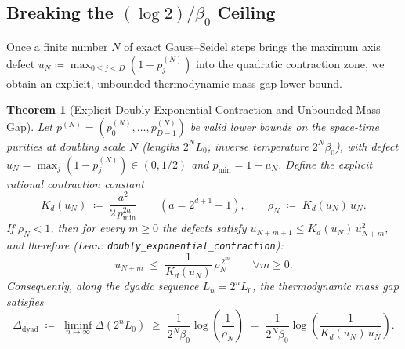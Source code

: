 \documentclass[11pt,a4paper]{article}
\newtheorem{theorem}{Theorem}[section]
\theoremstyle{definition}
\begin{document}
\subsection{Breaking the \texorpdfstring{$(\log 2)/\beta_0$}{(log 2)/beta0} Ceiling}

Once a finite number $N$ of exact Gauss--Seidel steps brings the maximum axis defect $u_N \coloneqq \max_{0 \le j < D}(1 - p_j^{(N)})$ into the quadratic contraction zone, we obtain an explicit, unbounded thermodynamic mass-gap lower bound.

\begin{theorem}[Explicit Doubly-Exponential Contraction and Unbounded Mass Gap]
\label{thm:doubly_exp}
Let $p^{(N)} = (p_0^{(N)},\dots,p_{D-1}^{(N)})$ be valid lower bounds on the space-time purities at doubling scale $N$ (lengths $2^N L_0$, inverse temperature $2^N \beta_0$), with defect $u_N = \max_j (1 - p_j^{(N)}) \in (0, 1/2)$ and $p_{\min} = 1 - u_N$. Define the explicit rational contraction constant
\begin{equation}
  K_d(u_N) \;\coloneqq\; \frac{a^2}{2\, p_{\min}^{2a}} \qquad (a = 2^{d+1} - 1),
  \qquad
  \rho_N \;\coloneqq\; K_d(u_N)\, u_N.
  \label{eq:Kd_rho}
\end{equation}
If $\rho_N < 1$, then for every $m \ge 0$ the defects satisfy $u_{N+m+1} \le K_d(u_N)\, u_{N+m}^2$, and therefore (Lean: \texttt{doubly\_exponential\_contraction}):
\begin{equation}
  u_{N+m} \;\le\; \frac{1}{K_d(u_N)}\, \rho_N^{\,2^m}
  \qquad\forall m \ge 0.
  \label{eq:doubly_exp_bound}
\end{equation}
Consequently, along the dyadic sequence $L_n = 2^n L_0$, the thermodynamic mass gap satisfies
\begin{equation}
  \Delta_{\mathrm{dyad}} \;\coloneqq\; \liminf_{n \to \infty} \Delta(2^n L_0)
  \;\ge\; \frac{1}{2^N \beta_0} \log\!\left(\frac{1}{\rho_N}\right)
  \;=\; \frac{1}{2^N \beta_0} \log\!\left(\frac{1}{K_d(u_N)\, u_N}\right).
  \label{eq:unbounded_gap}
\end{equation}
\end{theorem}
\end{document}
